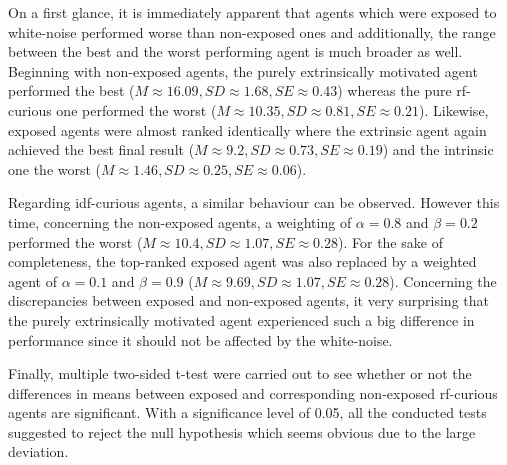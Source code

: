 \documentclass[draft,final]{vutinfth} %
\begin{document}
    On a first glance, it is immediately apparent that agents which were exposed to white-noise performed worse than non-exposed ones and additionally, the range between the best and the worst performing agent is much broader as well.
    Beginning with non-exposed agents, the purely extrinsically motivated agent performed the best ($M\approx16.09,SD\approx1.68,SE\approx0.43$) whereas the pure \gls{rf}-curious one performed the worst ($M\approx10.35,SD\approx0.81,SE\approx0.21$).
    Likewise, exposed agents were almost ranked identically where the extrinsic agent again achieved the best final result ($M\approx9.2,SD\approx0.73,SE\approx0.19$) and the intrinsic one the worst ($M\approx1.46,SD\approx0.25,SE\approx0.06$).

    Regarding \gls{idf}-curious agents, a similar behaviour can be observed.
    However this time, concerning the non-exposed agents, a weighting of $\alpha=0.8$ and $\beta=0.2$ performed the worst ($M\approx10.4,SD\approx1.07,SE\approx0.28$).
    For the sake of completeness, the top-ranked exposed agent was also replaced by a weighted agent of $\alpha=0.1$ and $\beta=0.9$ ($M\approx9.69,SD\approx1.07,SE\approx0.28$).
    Concerning the discrepancies between exposed and non-exposed agents, it very surprising that the purely extrinsically motivated agent experienced such a big difference in performance since it should not be affected by the white-noise.

    Finally, multiple two-sided t-test were carried out to see whether or not the differences in means between exposed and corresponding non-exposed \gls{rf}-curious agents are significant.
    With a significance level of 0.05, all the conducted tests suggested to reject the null hypothesis which seems obvious due to the large deviation.
\end{document}
